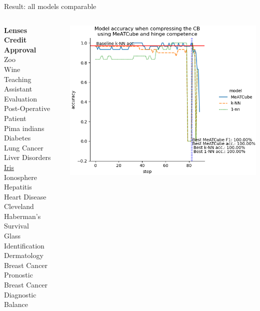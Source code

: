 \documentclass[]{beamer}
\begin{document}
\begin{frame}{Result: all models comparable}
    \begin{columns}
        \begin{column}{.35\textwidth}
            {\smaller\smaller
            \textbf{Lenses} \\
            \textbf{Credit Approval} \\
            Zoo \\
            Wine \\
            Teaching Assistant Evaluation \\
            Post-Operative Patient \\
            Pima indians Diabetes \\
            Lung Cancer \\
            Liver Disorders \\
            \underline{Iris} \\
            Ionosphere \\
            Hepatitis \\
            Heart Disease Cleveland \\
            Haberman's Survival \\
            Glass Identification \\
            Dermatology \\
            Breast Cancer Pronostic \\
            Breast Cancer Diagnostic \\
            Balance\\
            ~}
        \end{column}
        \begin{column}{.65\textwidth}
            \includegraphics[width=.8\textwidth]{../results/figs/iris.png}

\end{column}
\end{columns}
\end{frame}
\end{document}
